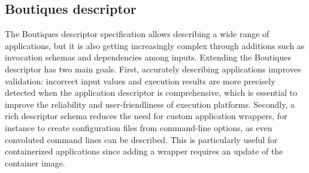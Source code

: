 \documentclass[a4paper,num-refs]{oup-contemporary}
\newcommand{\boutiques}{Boutiques\xspace}
\begin{document}
\subsection{\boutiques descriptor}

The \boutiques descriptor specification allows describing a wide range
of applications, but it is also getting increasingly complex through
additions such as invocation schemas and dependencies among
inputs. Extending the \boutiques descriptor has two main goals. First,
accurately describing applications improves validation: incorrect
input values and execution results are more precisely detected when
the application descriptor is comprehensive, which is essential to
improve the reliability and user-friendliness of execution
platforms. Secondly, a rich descriptor schema reduces the need for
custom application wrappers, for instance to create configuration
files from command-line options, as even convoluted command lines can
be described. This is particularly useful for containerized
applications since adding a wrapper requires an update of the
container image.
\end{document}
